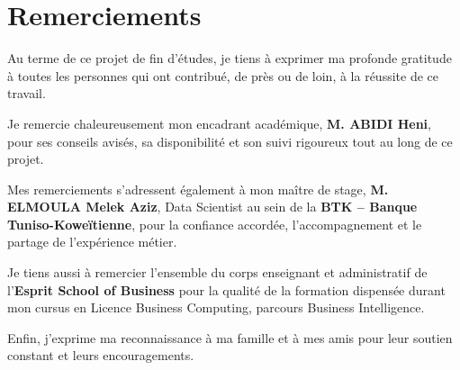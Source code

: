 \chapter*{Remerciements}

Au terme de ce projet de fin d'études, je tiens à exprimer ma profonde
gratitude à toutes les personnes qui ont contribué, de près ou de loin, à la
réussite de ce travail.

Je remercie chaleureusement mon encadrant académique, \textbf{M. ABIDI Heni}, pour
ses conseils avisés, sa disponibilité et son suivi rigoureux tout au long de ce
projet.

Mes remerciements s'adressent également à mon maître de stage,
\textbf{M. ELMOULA Melek Aziz}, Data Scientist au sein de la \textbf{BTK -- Banque
Tuniso-Koweïtienne},
pour la confiance accordée, l'accompagnement et le partage de l'expérience
métier.

Je tiens aussi à remercier l'ensemble du corps enseignant et administratif de
l'\textbf{Esprit School of Business} pour la qualité de la formation dispensée
durant mon cursus en Licence Business Computing, parcours Business Intelligence.

Enfin, j'exprime ma reconnaissance à ma famille et à mes amis pour leur soutien
constant et leurs encouragements.
